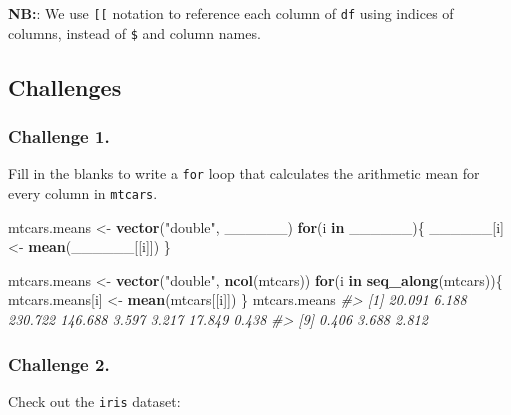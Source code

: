 \documentclass[]{book}
\newenvironment{Shaded}{\begin{snugshade}}{\end{snugshade}}
\newcommand{\KeywordTok}[1]{\textcolor[rgb]{0.13,0.29,0.53}{\textbf{#1}}}
\newcommand{\StringTok}[1]{\textcolor[rgb]{0.31,0.60,0.02}{#1}}
\newcommand{\CommentTok}[1]{\textcolor[rgb]{0.56,0.35,0.01}{\textit{#1}}}
\newcommand{\ControlFlowTok}[1]{\textcolor[rgb]{0.13,0.29,0.53}{\textbf{#1}}}
\newcommand{\NormalTok}[1]{#1}
\begin{document}
\textbf{NB:}: We use \texttt{{[}{[}} notation to reference each column
of \texttt{df} using indices of columns, instead of \texttt{\$} and
column names.

\subsection{Challenges}\label{challenges-22}

\subsubsection*{Challenge 1.}\label{challenge-1.-11}

Fill in the blanks to write a \texttt{for} loop that calculates the
arithmetic mean for every column in \texttt{mtcars}.

\begin{Shaded}
\begin{Highlighting}[]
\NormalTok{mtcars.means <-}\StringTok{ }\KeywordTok{vector}\NormalTok{(}\StringTok{"double"}\NormalTok{, ______)}
\ControlFlowTok{for}\NormalTok{(i }\ControlFlowTok{in}\NormalTok{ ______)\{}
\NormalTok{  ______[i] <-}\StringTok{ }\KeywordTok{mean}\NormalTok{(______[[i]])}
\NormalTok{\}}
\end{Highlighting}
\end{Shaded}

\begin{Shaded}
\begin{Highlighting}[]
\NormalTok{mtcars.means <-}\StringTok{ }\KeywordTok{vector}\NormalTok{(}\StringTok{"double"}\NormalTok{, }\KeywordTok{ncol}\NormalTok{(mtcars))}
\ControlFlowTok{for}\NormalTok{(i }\ControlFlowTok{in} \KeywordTok{seq_along}\NormalTok{(mtcars))\{}
\NormalTok{  mtcars.means[i] <-}\StringTok{ }\KeywordTok{mean}\NormalTok{(mtcars[[i]])}
\NormalTok{\}}
\NormalTok{mtcars.means}
\CommentTok{#>  [1]  20.091   6.188 230.722 146.688   3.597   3.217  17.849   0.438}
\CommentTok{#>  [9]   0.406   3.688   2.812}
\end{Highlighting}
\end{Shaded}

\subsubsection*{Challenge 2.}\label{challenge-2.-11}

Check out the \texttt{iris} dataset:
\end{document}
